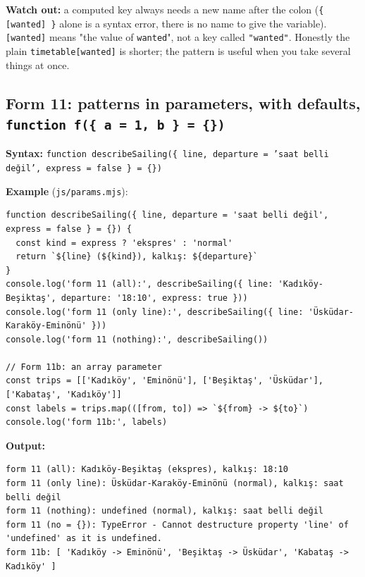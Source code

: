 \documentclass[
  10pt,
]{article}
\begin{document}
\textbf{Watch out:} a computed key always needs a new name after the
colon (\texttt{\{ [\allowbreak{}wanted] \}} alone is a syntax error,
there is no name to give the variable). \texttt{[\allowbreak{}wanted]}
means "the value of \texttt{wanted}", not a key called
\texttt{"wanted"}. Honestly the plain
\texttt{timetable[\allowbreak{}wanted]} is shorter; the pattern is
useful when you take several things at once.

\hypertarget{form-11-patterns-in-parameters-with-defaults-function-f-a--1-b---}{%
\subsection{\texorpdfstring{Form 11: patterns in parameters, with
defaults,
\texttt{function f(\allowbreak{}\{ a =\allowbreak{} 1,\allowbreak{} b \} =\allowbreak{} \{\})}}{Form 11: patterns in parameters, with defaults, }}\label{form-11-patterns-in-parameters-with-defaults-function-f-a--1-b---}}

\textbf{Syntax:}
\texttt{function describeSailing(\allowbreak{}\{ line,\allowbreak{} departure =\allowbreak{} 'saat belli değil',\allowbreak{} express =\allowbreak{} false \} =\allowbreak{} \{\})}

\textbf{Example} (\texttt{js/\allowbreak{}params.\allowbreak{}mjs}):

\begin{verbatim}
function describeSailing({ line, departure = 'saat belli değil', express = false } = {}) {
  const kind = express ? 'ekspres' : 'normal'
  return `${line} (${kind}), kalkış: ${departure}`
}
console.log('form 11 (all):', describeSailing({ line: 'Kadıköy-Beşiktaş', departure: '18:10', express: true }))
console.log('form 11 (only line):', describeSailing({ line: 'Üsküdar-Karaköy-Eminönü' }))
console.log('form 11 (nothing):', describeSailing())

// Form 11b: an array parameter
const trips = [['Kadıköy', 'Eminönü'], ['Beşiktaş', 'Üsküdar'], ['Kabataş', 'Kadıköy']]
const labels = trips.map(([from, to]) => `${from} -> ${to}`)
console.log('form 11b:', labels)
\end{verbatim}

\textbf{Output:}

\begin{verbatim}
form 11 (all): Kadıköy-Beşiktaş (ekspres), kalkış: 18:10
form 11 (only line): Üsküdar-Karaköy-Eminönü (normal), kalkış: saat belli değil
form 11 (nothing): undefined (normal), kalkış: saat belli değil
form 11 (no = {}): TypeError - Cannot destructure property 'line' of 'undefined' as it is undefined.
form 11b: [ 'Kadıköy -> Eminönü', 'Beşiktaş -> Üsküdar', 'Kabataş -> Kadıköy' ]
\end{verbatim}
\end{document}
